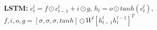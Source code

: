 \textbf{LSTM:} $c_t^l = f \odot c_{t-1}^l + i \odot g$,
$h_t = o \odot tanh(c_t^l)$,\\
$f,i,o, g = [\sigma,\sigma,\sigma,tanh]\odot W^l[h_{t-1}^l h_t^{l-1}]^T$\\


